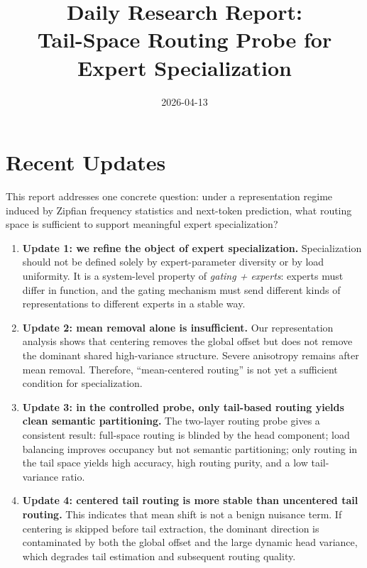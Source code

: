 \documentclass[11pt]{article}
\title{Daily Research Report:\\Tail-Space Routing Probe for Expert Specialization}
\author{}
\date{2026-04-13}
\begin{document}
\maketitle

\section{Recent Updates}

This report addresses one concrete question: under a representation regime induced by Zipfian frequency statistics and next-token prediction, what routing space is sufficient to support meaningful expert specialization?

\begin{enumerate}
    \item \textbf{Update 1: we refine the object of expert specialization.}  
    Specialization should not be defined solely by expert-parameter diversity or by load uniformity. It is a system-level property of \emph{gating + experts}: experts must differ in function, and the gating mechanism must send different kinds of representations to different experts in a stable way.

    \item \textbf{Update 2: mean removal alone is insufficient.}  
    Our representation analysis shows that centering removes the global offset but does not remove the dominant shared high-variance structure. Severe anisotropy remains after mean removal. Therefore, ``mean-centered routing'' is not yet a sufficient condition for specialization.

    \item \textbf{Update 3: in the controlled probe, only tail-based routing yields clean semantic partitioning.}  
    The two-layer routing probe gives a consistent result: full-space routing is blinded by the head component; load balancing improves occupancy but not semantic partitioning; only routing in the tail space yields high accuracy, high routing purity, and a low tail-variance ratio.

    \item \textbf{Update 4: centered tail routing is more stable than uncentered tail routing.}  
    This indicates that mean shift is not a benign nuisance term. If centering is skipped before tail extraction, the dominant direction is contaminated by both the global offset and the large dynamic head variance, which degrades tail estimation and subsequent routing quality.
\end{enumerate}
\end{document}
